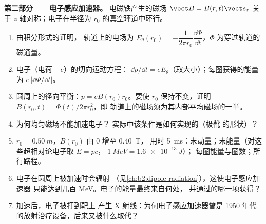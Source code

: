 \begin{problem}
\medskip
\noindent\textbf{第二部分——电子感应加速器。}
电磁铁产生的磁场 $\vect B = B(r, t)\vect e_z$ 关于
$z$ 轴对称；电子在半径为 $r_0$ 的真空环道中环行。
\begin{enumerate}[resume]
  \item 由积分形式的证明，
        轨道上的电场为 $E_\theta(r_0) = -\dfrac1{2\pi r_0}
        \dfrac{\dd\Phi}{\dd t}$，$\Phi$ 为穿过轨道的磁通量。
  \item 电子（电荷 $-e$）的切向运动方程：
        $\dd p/\dd t = eE_\theta$（取大小）；每圈获得的能量为
        $e\,|\dd\Phi/\dd t|$。
  \item 圆周上的径向平衡：$p = eB(r_0)r_0$。要使 $r_0$
        保持不变，证明 $B(r_0, t) = \Phi(t)/2\pi r_0^2$，即
        轨道上的磁场须为其内部平均磁场的一半。
  \item 为何均匀磁场不能加速电子？
        实际中该条件是如何实现的（极靴
        的形状）？
  \item $r_0 = \qty{0.50}{m}$，$B(r_0)$ 由 $0$ 增至 \qty{0.40}{T}，
        用时 \qty{5}{ms}：末动量；末能量（对这些超相对论电子取 $E = pc$，
        $\qty{1}{MeV} = \qty{1.6e-13}{J}$）；
        每圈能量与圈数；所行路程。
  \item 电子在圆周上被加速时会辐射
        （见\cref{ch:b2:dipole-radiation}），这使电子感应加速器
        只能达到几百 MeV。电子的能量最终来自何处，
        并通过的哪一项获得？
  \item 加速后，电子被打到靶上
        产生 X 射线：为何电子感应加速器曾是
        1950 年代的放射治疗设备，后来又被什么取代？
\end{enumerate}


\end{problem}
